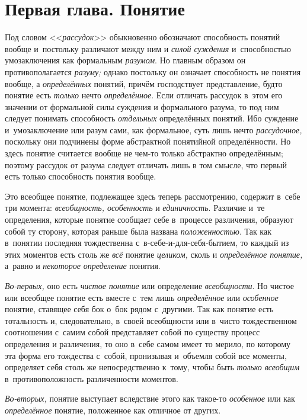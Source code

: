 \bigskip

\chapter[{\em Первая глава} Понятие]{Первая глава. Понятие}

Под словом <<{\em рассудок}>> обыкновенно обозначают способность
понятий вообще и~постольку различают между
ним и {\em силой суждения} и~способностью умозаключения как формальным
{\em разумом}. Но главным образом он противополагается
{\em разуму;} однако постольку он означает способность не понятия вообще, а
{\em определённых} понятий, причём господствует представление, будто понятие
есть {\em только} нечто {\em определённое}. Если
отличать рассудок в~этом его значении от формальной силы суждения и
формального разума, то под ним следует понимать способность {\em отдельных}
определённых понятий. Ибо суждение и~умозаключение или разум
сами, как формальное, суть лишь нечто {\em рассудочное,}
поскольку они подчинены форме абстрактной понятийной
определённости. Но здесь понятие считается вообще не чем-то только
абстрактно определённым; поэтому рассудок от разума следует отличать лишь в
том смысле, что первый есть только способность понятия вообще.

Это всеобщее понятие, подлежащее здесь теперь рассмотрению,
содержит в~себе три момента: {\em всеобщность, особенность} и
{\em единичность}. Различие и~те определения, которые понятие сообщает себе
в~процессе различения, образуют собой ту сторону, которая раньше была названа
{\em положенностью}. Так
как в~понятии последняя тождественна с~в-себе-и-для-себя-бытием, то каждый
из этих моментов есть столь же {\em всё} понятие {\em целиком,} сколь и
{\em определённое понятие,} а~равно и {\em некоторое определение} понятия.

{\em Во-первых,} оно есть {\em чистое понятие} или определение
{\em всеобщности}. Но чистое или всеобщее понятие есть вместе с~тем лишь
{\em определённое} или {\em особенное} понятие,
ставящее себя бок о~бок рядом с~другими. Так как понятие есть тотальность
и, следовательно, в~своей всеобщности или в~чисто тождественном соотношении
с~самим собой представляет собой по существу процесс определения и
различения, то оно в~себе самом имеет то мерило, по которому эта форма его
тождества с~собой, пронизывая и~объемля собой все моменты, определяет себя
столь же непосредственно к~тому, чтобы быть
{\em только всеобщим} в~противоположность различенности моментов.

{\em Во-вторых,} понятие выступает вследствие этого как такое-то
{\em особенное} или как {\em определённое} понятие, положенное как
отличное от других.

